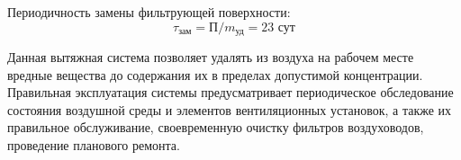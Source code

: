 Периодичность замены фильтрующей поверхности:
$$
    \tau_\text{зам} = \text{П} / m_\text{уд} = 23 \text{ сут}
$$

Данная вытяжная система позволяет удалять из воздуха на рабочем месте вредные
вещества до содержания их в пределах допустимой концентрации. Правильная эксплуатация
системы предусматривает периодическое обследование состояния воздушной среды и
элементов вентиляционных установок, а также их правильное обслуживание, своевременную
очистку фильтров воздуховодов, проведение планового ремонта.
